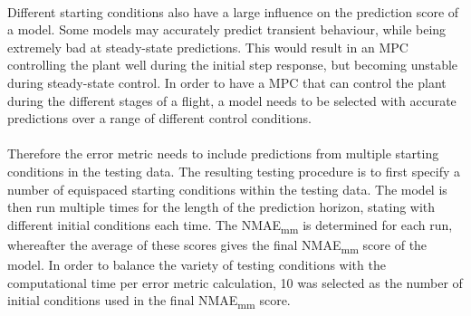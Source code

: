 
        \paragraph{}
        Different starting conditions also have a large influence on the prediction score of a model.
        Some models may accurately predict transient behaviour, 
        while being extremely bad at steady-state predictions.
        This would result in an MPC controlling the plant well during the initial step response,
        but becoming unstable during steady-state control.
        In order to have a MPC that can control the plant during the different stages of a flight, 
        a model needs to be selected with accurate predictions over a range of different control conditions.
        
        \paragraph{}
        Therefore the error metric needs to include predictions from multiple starting conditions in the testing data.
        The resulting testing procedure is to first specify a number of equispaced starting conditions within the testing data.
        The model is then run multiple times for the length of the prediction horizon, 
        stating with different initial conditions each time.
        The NMAE\textsubscript{mm} is determined for each run, 
        whereafter the average of these scores gives the final NMAE\textsubscript{mm} score of the model.
        In order to balance the variety of testing conditions with the computational time per error metric calculation, 
        10 was selected as the number of initial conditions used in the final NMAE\textsubscript{mm} score. 
        

